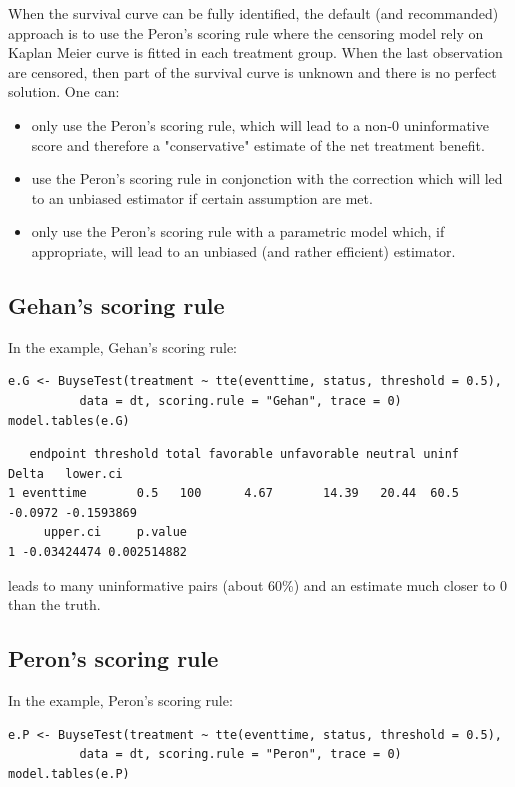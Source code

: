 \documentclass[12pt]{article}
\begin{document}
When the survival curve can be fully identified, the default (and
recommanded) approach is to use the Peron's scoring rule where the
censoring model rely on Kaplan Meier curve is fitted in each treatment
group. When the last observation are censored, then part of the
survival curve is unknown and there is no perfect solution. One can:
\begin{itemize}
\item only use the Peron's scoring rule, which will lead to a non-0
uninformative score and therefore a "conservative" estimate of the net treatment benefit.
\item use the Peron's scoring rule in conjonction with the correction
which will led to an unbiased estimator if certain assumption are met.
\item only use the Peron's scoring rule with a parametric model which, if
appropriate, will lead to an unbiased (and rather efficient)
estimator.
\end{itemize}

\subsection{Gehan's scoring rule}
\label{sec:org53cb0bb}
In the example, Gehan's scoring rule:
\lstset{language=r,label= ,caption= ,captionpos=b,numbers=none}
\begin{lstlisting}
e.G <- BuyseTest(treatment ~ tte(eventtime, status, threshold = 0.5),
          data = dt, scoring.rule = "Gehan", trace = 0)
model.tables(e.G)
\end{lstlisting}

\begin{verbatim}
   endpoint threshold total favorable unfavorable neutral uninf   Delta   lower.ci
1 eventtime       0.5   100      4.67       14.39   20.44  60.5 -0.0972 -0.1593869
     upper.ci     p.value
1 -0.03424474 0.002514882
\end{verbatim}


leads to many uninformative pairs (about 60\%) and an estimate much
closer to 0 than the truth.

\subsection{Peron's scoring rule}
\label{sec:orgd08a003}
In the example, Peron's scoring rule:
\lstset{language=r,label= ,caption= ,captionpos=b,numbers=none}
\begin{lstlisting}
e.P <- BuyseTest(treatment ~ tte(eventtime, status, threshold = 0.5),
          data = dt, scoring.rule = "Peron", trace = 0)
model.tables(e.P)
\end{lstlisting}
\end{document}
